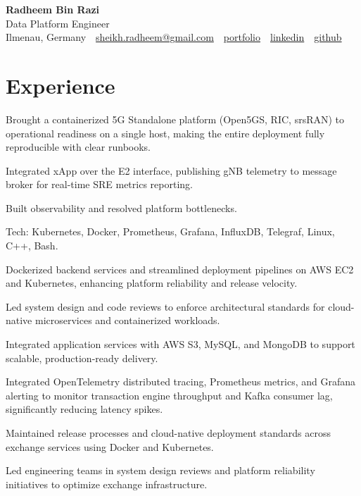 \documentclass[10pt,a4paper]{resume}
\makeatletter
\newcommand{\Portfolio}{https://radheem.github.io/my-cv}
\newcommand{\PortfolioText}{portfolio}
\newcommand{\GitHub}{https://github.com/radheem}
\newcommand{\LinkedIn}{https://www.linkedin.com/in/radheem-razi}
\newcommand{\Email}{sheikh.radheem@gmail.com}
\makeatother
\begin{document}
\begin{center}
  {\huge\bfseries Radheem Bin Razi}\\[3pt]
  {\large Data Platform Engineer}\\[6pt]
  \small
  Ilmenau, Germany \,\textbar\,
  \href{mailto:\Email}{\Email} \,\textbar\,
  \href{\Portfolio}{\PortfolioText} \,\textbar\,
  \href{\LinkedIn}{linkedin} \,\textbar\,
  \href{\GitHub}{github}
\end{center}
\vspace{2pt}

\section{Experience}

\bullets
  \item Brought a containerized 5G Standalone platform (Open5GS, RIC, srsRAN) to operational readiness on a single host, making the entire deployment fully reproducible with clear runbooks.
  \item Integrated xApp over the E2 interface, publishing gNB telemetry to message broker for real-time SRE metrics reporting.
  \item Built observability and resolved platform bottlenecks.
  \item Tech: Kubernetes, Docker, Prometheus, Grafana, InfluxDB, Telegraf, Linux, C++, Bash.
\bulletsend
\vspace{1.5pt}
\bullets
  \item Dockerized backend services and streamlined deployment pipelines on AWS EC2 and Kubernetes, enhancing platform reliability and release velocity.
  \item Led system design and code reviews to enforce architectural standards for cloud-native microservices and containerized workloads.
  \item Integrated application services with AWS S3, MySQL, and MongoDB to support scalable, production-ready delivery.
\bulletsend
\vspace{1.5pt}
\bullets
  \item Integrated OpenTelemetry distributed tracing, Prometheus metrics, and Grafana alerting to monitor transaction engine throughput and Kafka consumer lag, significantly reducing latency spikes.
  \item Maintained release processes and cloud-native deployment standards across exchange services using Docker and Kubernetes.
  \item Led engineering teams in system design reviews and platform reliability initiatives to optimize exchange infrastructure.
\bulletsend
\vspace{1.5pt}
\end{document}
